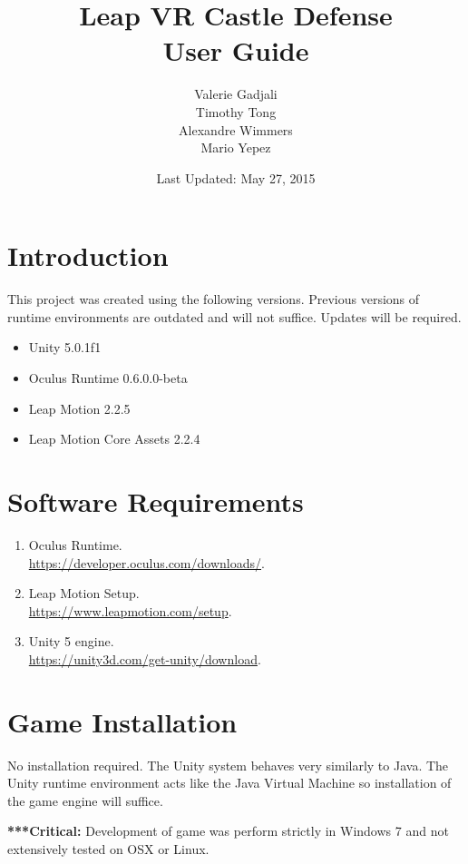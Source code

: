 \documentclass[a4paper]{refart}
\title{Leap VR Castle Defense\\User Guide}
\author{Valerie Gadjali\\
	Timothy Tong\\
	Alexandre Wimmers\\
	Mario Yepez
}
\date{Last Updated: May 27, 2015}
\begin{document}
\maketitle

\tableofcontents

\newpage

\section{Introduction}

This project was created using the following versions. Previous versions of runtime environments are outdated and will not suffice. Updates will be required.

\begin{itemize}
	\item Unity 5.0.1f1
	\item Oculus Runtime 0.6.0.0-beta
	\item Leap Motion 2.2.5
	\item Leap Motion Core Assets 2.2.4
\end{itemize}

\section{Software Requirements}

\begin{enumerate}
	\item Oculus Runtime.\\ \url{https://developer.oculus.com/downloads/}.
	\item Leap Motion Setup.\\ \url{https://www.leapmotion.com/setup}.
	\item Unity 5 engine.\\ \url{https://unity3d.com/get-unity/download}.
\end{enumerate}

\section{Game Installation}

No installation required. The Unity system behaves very similarly to Java. The Unity runtime environment acts like the Java Virtual Machine so installation of the game engine will suffice. 

\textbf{***Critical:} Development of game was perform strictly in Windows 7 and not extensively tested on OSX or Linux.
\end{document}
